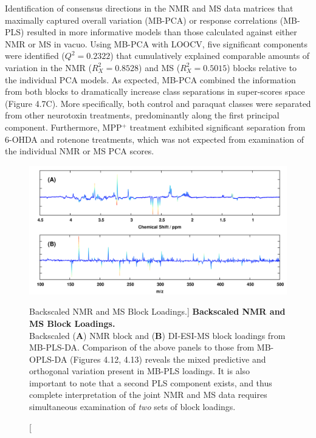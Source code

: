 \begin{doublespace}
Identification of consensus directions in the NMR and MS data matrices that
maximally captured overall variation (MB-PCA) or response correlations (MB-PLS)
resulted in more informative models than those calculated against either NMR
or MS in vacuo. Using MB-PCA with LOOCV, five significant components were
identified ($Q^2 = 0.2322$) that cumulatively explained comparable amounts
of variation in the NMR ($R^2_X = 0.8528$) and MS ($R^2_X = 0.5015$) blocks
relative to the individual PCA models. As expected, MB-PCA combined the
information from both blocks to dramatically increase class separations in
super-scores space (Figure 4.7C). More specifically, both control and paraquat
classes were separated from other neurotoxin treatments, predominantly along
the first principal component. Furthermore, MPP$^+$ treatment exhibited
significant separation from 6-OHDA and rotenone treatments, which was not
expected from examination of the individual NMR or MS PCA scores.
\end{doublespace}

\begin{figure}[ht!]
\includegraphics[width=6.5in]{figs/apps/11-mbpls-p.png}
\caption
      [Backscaled NMR and MS Block Loadings.]{
  {\bf Backscaled NMR and MS Block Loadings.}
  \\
  Backscaled ({\bf A}) \hnmr{} NMR block and ({\bf B}) DI-ESI-MS block loadings
  from MB-PLS-DA. Comparison of the above panels to those from MB-OPLS-DA
  (Figures 4.12, 4.13) reveals the mixed predictive and orthogonal variation
  present in MB-PLS loadings. It is also important to note that a second
  PLS component exists, and thus complete interpretation of the joint NMR
  and MS data requires simultaneous examination of \emph{two} sets of
  block loadings.
}
\end{figure}

